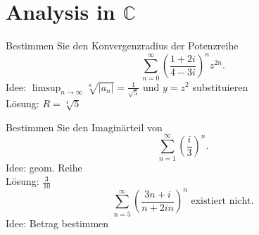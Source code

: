 \section{Analysis in $\mathbb{C}$}
Bestimmen Sie den Konvergenzradius der Potenzreihe
\begin{displaymath}
  \sum_{n = 0}^{\infty} \left(\frac{1+2i}{4-3i}\right)^n z^{2n}.
\end{displaymath}
Idee: $\limsup_{n \to \infty} \sqrt[n]{|a_n|} = \frac{1}{\sqrt{5}}$ und $y = z^2$ substituieren\\
Lösung: $R = \sqrt[4]{5}$

Bestimmen Sie den Imaginärteil von
\begin{displaymath}
  \sum_{n = 1}^{\infty} \left(\frac{i}{3}\right)^n.
\end{displaymath}
Idee: geom. Reihe\\
Lösung: $\frac{3}{10}$
\begin{displaymath}
\sum_{n = 5}^{\infty} \left(\frac{3n+i}{n + 2in}\right)^n \text{ existiert nicht.}
\end{displaymath}
Idee: Betrag bestimmen